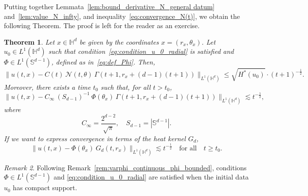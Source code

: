 \documentclass[12pt,longbibliography]{article}
\def\S{\mathbb{S}}
\def\H{\mathbb{H}}
\newtheorem{thm}{Theorem}[section]
\theoremstyle{definition}
\theoremstyle{remark}
\newtheorem{rem}[thm]{Remark}
\theoremstyle{example}
\begin{document}
Putting together Lemmata~\ref{lem:bound_derivative_N_general datum} and~\ref{lem:value_N_infty}, and inequality~\eqref{eq:convergence_N(t)}, we obtain the following Theorem. The proof is left for the reader as an exercise.

\begin{thm}\label{thm:integrable_L^1_Lînfty_convergence}
	Let $x\in\H^d$ be given by the coordinates $x=(r_x,\theta_x)$. Let $u_0\in L^1(\H^d)$ such that condition~\eqref{eq:condition_u_0_radial} is satisfied  and $\Phi \in L^1(\mathbb{S}^{d-1})$, defined as in~\eqref{eq:def_Phi}. Then,
	\[
	\| u(t,x) - C(t)\ \mathcal{N}(t,\theta)\ \Gamma(t+1, r_x+(d-1)(t+1)) \|_{L^1(\mathbb{H}^d)}  \leq \sqrt{H^*(u_0)}\cdot (t+1)^{-\frac{1}{2}}.
	\]
	Moreover, there exists a time $t_0$ such that, for all $t>t_0$,
	\[
	\| u(t,x) - C_\infty\ (S_{d-1})^{-1}\ \Phi(\theta_x)\ \Gamma(t+1, r_x+(d-1)(t+1)) \|_{L^1(\mathbb{H}^d)}  \lesssim t^{-\frac{1}{2}},
	\]
	where
	\[
	C_\infty = \frac{2^{d-2}}{\sqrt{\pi}},\quad S_{d-1} = |\S^{d-1}|.
	\]
	If we want to express convergence in terms of the heat kernel $G_d$,
	\[
	\| u(t,x) - \Phi(\theta_x)\ G_d(t,r_x) \|_{L^1(\mathbb{H}^d)}  \lesssim t^{-\frac{1}{2}}\quad \text{for all}\quad t\geq t_0.
	\]
\end{thm}

\begin{rem}
	Following Remark~\ref{rem:varphi_continuous_phi_bounded}, conditions $\Phi \in L^1(\mathbb{S}^{d-1})$ and \eqref{eq:condition_u_0_radial} are satisfied when the initial data $u_0$ has compact support.
\end{rem}
\end{document}
